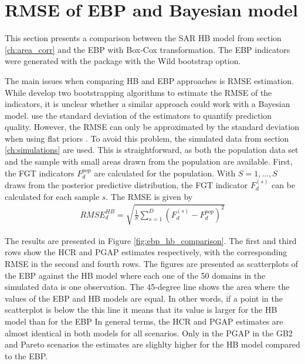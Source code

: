 \section{RMSE of EBP and Bayesian model}

This section presents a comparison between the SAR HB model from section \ref{ch:area_corr} and the EBP with Box-Cox transformation.
The EBP indicators were generated with the package  \citep{kreutzmann_r_2019} with the Wild bootstrap option.

The main issues when comparing HB and EBP approaches is RMSE estimation.
While \cite{rojas_perilla_data_2020} develop two bootstrapping algorithms to estimate the RMSE of the indicators, it is unclear whether a similar approach could work with a Bayesian model.
\cite{molina_small_2014} use the standard deviation of the estimators to quantify prediction quality.
However, the RMSE can only be approximated by the standard deviation when using flat priors \citep[Chapter 10.3.2]{rao_small_2015}.
To avoid this problem, the simulated data from section \ref{ch:simulations} are used.
This is straightforward, as both the population data set and the sample with small areas drawn from the population are available.
First, the FGT indicators $F_d^{pop}$ are calculated for the population. With $S = 1, ..., S$ draws from the posterior predictive distribution, the FGT indicator $F_d^{(s)}$ can be calculated for each sample $s$.
The RMSE is given by
\begin{gather*}
    RMSE_d^{HB} = \displaystyle \sqrt{\frac 1 S \sum_{s = 1}^D (F_d^{(s)} - F_d^{pop})^2}
\end{gather*}



The results are presented in Figure \ref{fig:ebp_hb_comparison}.
The first and third rows show the HCR and PGAP estimates respectively, with the corresponding RMSE in the second and fourth rows.
The figures are presented as scatterplots of the EBP against the HB model where each one of the 50 domains in the simulated data is one observation.
The 45-degree line shows the area where the values of the EBP and HB models are equal.
In other words, if a point in the scatterplot is below the this line it means that its value is larger for the HB model than for the EBP
In general terms, the HCR and PGAP estimates are almost identical in both models for all scenarios.
Only in the PGAP in the GB2 and Pareto scenarios the estimates are slighlty higher for the HB model compared to the EBP.


